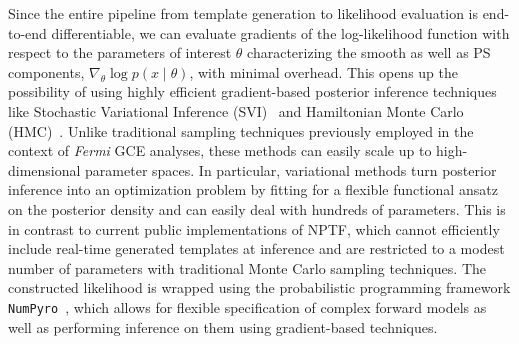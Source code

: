\documentclass{article}
\theoremstyle{plain}
\theoremstyle{definition}
\theoremstyle{remark}
\newcommand{\Fermi} {\emph{Fermi}\xspace}
\begin{document}
Since the entire pipeline from template generation to likelihood evaluation is end-to-end differentiable, we can evaluate gradients of the log-likelihood function with respect to the parameters of interest $\theta$ characterizing the smooth as well as PS components, $\nabla_\theta\log p(x\mid\theta)$, with minimal overhead. This opens up the possibility of using highly efficient gradient-based posterior inference techniques like Stochastic Variational Inference (SVI)~\cite{2012arXiv1206.7051H} and Hamiltonian Monte Carlo (HMC)~\cite{2011arXiv1111.4246H}. 
Unlike traditional sampling techniques previously employed in the context of \Fermi GCE analyses, these methods can easily scale up to high-dimensional parameter spaces. In particular, variational methods turn posterior inference into an optimization problem by fitting for a flexible functional ansatz on the posterior density and can easily deal with hundreds of parameters. This is in contrast to current public implementations of NPTF, which cannot efficiently include real-time generated templates at inference and are restricted to a modest number of parameters with traditional Monte Carlo sampling techniques. 
The constructed likelihood is wrapped using the probabilistic programming framework \texttt{NumPyro}~\cite{2019arXiv191211554P}, which allows for flexible specification of complex forward models as well as performing inference on them using gradient-based techniques.


\end{document}
